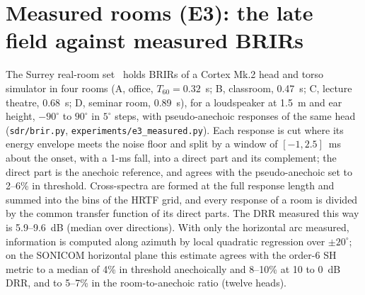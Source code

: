 \documentclass[10pt]{article}
\theoremstyle{definition}
\begin{document}
\section{Measured rooms (E3): the late field against measured BRIRs}\label{sec:e3}
The Surrey real-room set~\cite{hummersone2010} holds BRIRs of a Cortex Mk.2 head and torso simulator in four rooms (A, office, $T_{60}=0.32$~s; B, classroom, 0.47~s; C, lecture theatre, 0.68~s; D, seminar room, 0.89~s), for a loudspeaker at 1.5~m and ear height, $-90^\circ$ to $90^\circ$ in $5^\circ$ steps, with pseudo-anechoic responses of the same head (\texttt{sdr/brir.py}, \texttt{experiments/e3\_measured.py}). Each response is cut where its energy envelope meets the noise floor and split by a window of $[-1, 2.5]$~ms about the onset, with a 1-ms fall, into a direct part and its complement; the direct part is the anechoic reference, and agrees with the pseudo-anechoic set to 2--6\% in threshold. Cross-spectra are formed at the full response length and summed into the bins of the HRTF grid, and every response of a room is divided by the common transfer function of its direct parts. The DRR measured this way is 5.9--9.6~dB (median over directions). With only the horizontal arc measured, information is computed along azimuth by local quadratic regression over $\pm20^\circ$; on the SONICOM horizontal plane this estimate agrees with the order-6 SH metric to a median of 4\% in threshold anechoically and 8--10\% at 10 to 0~dB DRR, and to 5--7\% in the room-to-anechoic ratio (twelve heads).
\end{document}
